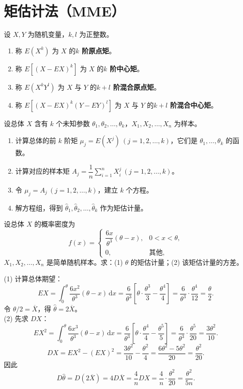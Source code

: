 \documentclass[lang=cn,11pt]{elegantbook}
\begin{document}
\section{矩估计法（MME）} \label{subsec:mme}

\begin{definition}[矩] \label{def:moments}
设 \(X, Y\) 为随机变量，\(k, l\) 为正整数。
\begin{enumerate}
    \item 称 \(E(X^k)\) 为 \(X\) 的\textbf{\(k\) 阶原点矩}。
    \item 称 \(E[(X - EX)^k]\) 为 \(X\) 的\textbf{\(k\) 阶中心矩}。
    \item 称 \(E(X^k Y^l)\) 为 \(X\) 与 \(Y\) 的\textbf{\(k+l\) 阶混合原点矩}。
    \item 称 \(E[(X - EX)^k (Y - EY)^l]\) 为 \(X\) 与 \(Y\) 的\textbf{\(k+l\) 阶混合中心矩}。
\end{enumerate}
设总体 \(X\) 含有 \(k\) 个未知参数 \(\theta_1, \theta_2, \dots, \theta_k\)，\(X_1, X_2, \dots, X_n\) 为样本。
\begin{enumerate}
    \item 计算总体的前 \(k\) 阶矩 \(\mu_j = E(X^j)\ (j=1,2,\dots,k)\)，它们是 \(\theta_1, \dots, \theta_k\) 的函数。
    \item 计算对应的样本矩 \(A_j = \dfrac{1}{n}\displaystyle\sum_{i=1}^{n}X_i^j\ (j=1,2,\dots,k)\)。
    \item 令 \(\mu_j = A_j\ (j=1,2,\dots,k)\)，建立 \(k\) 个方程。
    \item 解方程组，得到 \(\hat{\theta}_1, \hat{\theta}_2, \dots, \hat{\theta}_k\) 作为矩估计量。
\end{enumerate}
\end{definition}

\begin{exercise}[矩估计量的方差] \label{ex:mom_03}
设总体 \(X\) 的概率密度为
\[
f(x)=
\begin{cases}
\dfrac{6x}{\theta^3}(\theta-x), & 0<x<\theta,\\
0, & \text{其他},
\end{cases}
\]
\(X_1,X_2,\dots,X_n\) 是简单随机样本。求：(1) \(\theta\) 的矩估计量；(2) 该矩估计量的方差。
\end{exercise}
\begin{solution}
(1) 计算总体期望：
\[
EX=\int_0^\theta\frac{6x^2}{\theta^3}(\theta-x)\,\mathrm{d}x=\frac{6}{\theta^3}\!\left[\theta\cdot\frac{\theta^3}{3}-\frac{\theta^4}{4}\right]=\frac{6}{\theta^3}\cdot\frac{\theta^4}{12}=\frac{\theta}{2}.
\]
令 \(\theta/2=\overline{X}\)，得 \(\hat{\theta}=2\overline{X}\)。\\
(2) 先求 \(DX\)：
\[
EX^2=\int_0^\theta\frac{6x^3}{\theta^3}(\theta-x)\,\mathrm{d}x=\frac{6}{\theta^3}\!\left[\theta\cdot\frac{\theta^4}{4}-\frac{\theta^5}{5}\right]=\frac{6}{\theta^3}\cdot\frac{\theta^5}{20}=\frac{3\theta^2}{10}.
\]
\[
DX=EX^2-(EX)^2=\frac{3\theta^2}{10}-\frac{\theta^2}{4}=\frac{6\theta^2-5\theta^2}{20}=\frac{\theta^2}{20}.
\]
因此
\[
D\hat{\theta}=D(2\overline{X})=4D\overline{X}=\frac{4}{n}DX=\frac{4}{n}\cdot\frac{\theta^2}{20}=\frac{\theta^2}{5n}.
\]
\end{solution}
\end{document}
